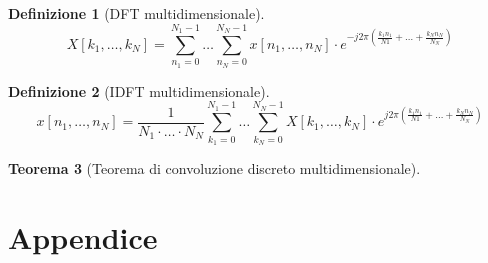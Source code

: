 \documentclass[a4paper,10pt]{article}
\theoremstyle{mystyle}
\newtheorem{theorem}{Teorema}[section]
\newtheorem{definition}[theorem]{Definizione}
\begin{document}
\begin{definition}[DFT multidimensionale]
   \[
    X[k_1, \ldots , k_N] = \sum_{n_1 = 0}^{N_1 -1} \ldots \sum_{n_N = 0}^{N_N -1} x[n_1 , \ldots , n_N] \cdot e^{-j 2 \pi \left(\frac{k_1 n_1}{N1} + \ldots + \frac{k_N n_N}{N_N}\right)}
    \]
\end{definition}

\begin{definition}[IDFT multidimensionale]
    \[
        x[n_1 , \ldots , n_N] = \frac{1}{N_1 \cdot \ldots  \cdot N_N} \sum_{k_1 = 0}^{N_1 -1} \ldots \sum_{k_N = 0}^{N_N -1} X[k_1 , \ldots , k_N] \cdot e^{j 2 \pi \left(\frac{k_1 n_1}{N1} + \ldots + \frac{k_N n_N}{N_N}\right)}
    \]
\end{definition}

\begin{theorem}[Teorema di convoluzione discreto multidimensionale]
    
\end{theorem}


\newpage



\part{Appendice}
\appendix
\large
\end{document}
